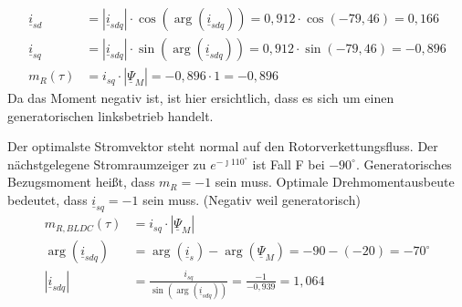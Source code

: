 \begin{solution}
\begin{compactenum}
\begin{align}
			\underline{i}_{sd} & = |\underline{i}_{sdq}| \cdot \cos(\arg(\underline{i}_{sdq})) = 0,912 \cdot \cos(-79,46) = 0,166 \\
			\underline{i}_{sq} & = |\underline{i}_{sdq}| \cdot \sin(\arg(\underline{i}_{sdq})) = 0,912 \cdot \sin(-79,46) = -0,896 \\
			m_R(\tau)& =  i_{sq} \cdot | \underline{\Psi}_M|= -0,896 \cdot 1 = -0,896
		\end{align}
		Da das Moment negativ ist, ist hier ersichtlich, dass es sich um einen generatorischen linksbetrieb handelt.
		\begin{figure}[H]
			\label{fig:20160615lsg12}
		\end{figure}
		\item Der optimalste Stromvektor steht normal auf den Rotorverkettungsfluss. Der nächstgelegene Stromraumzeiger zu $e^{-\jmath 110 ^\circ}$ ist Fall F bei $-90 ^\circ$. Generatorisches Bezugsmoment heißt, dass $m_R=-1$ sein muss. Optimale Drehmomentausbeute bedeutet, dass $\underline{i}_{sq} = -1$ sein muss. (Negativ weil generatorisch)
		\begin{align}
			m_{R,BLDC}(\tau)& =  i_{sq} \cdot | \underline{\Psi}_M|\\
			\arg(\underline{i}_{sdq}) &= \arg(\underline{i}_s) - \arg(\underline{\Psi}_M) = -90 - (-20) = -70^\circ \\
			|\underline{i}_{sdq}| &= \frac{i_{sq}}{\sin(\arg(\underline{i}_{sdq}))}= \frac{-1}{-0,939}=1,064 \\

\end{align}
\end{compactenum}
\end{solution}
